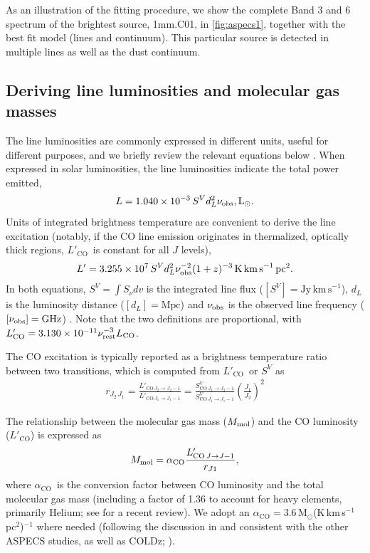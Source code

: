 \documentclass[twocolumn]{aastex62}
\newcommand{\solarmass}{\ensuremath{\mathrm{M}_{\odot}}}
\newcommand{\solarlum}{\ensuremath{\mathrm{L}_{\odot}}}
\newcommand{\Msun}{\solarmass}
\newcommand{\Lsun}{\solarlum}
\newcommand{\LCO}{\ensuremath{L'_{\mathrm{CO}}}}
\newcommand{\aco}{\ensuremath{\alpha_{\mathrm{CO}}}}
\begin{document}
As an illustration of the fitting procedure, we show the complete Band 3 and 6
spectrum of the brightest source, 1mm.C01, in \autoref{fig:aspecs1}, together
with the best fit model (lines and continuum).  This particular source is
detected in multiple lines as well as the dust continuum.

\subsection{Deriving line luminosities and molecular gas masses}
\label{sec:note-units-derived}
The line luminosities are commonly expressed in different units, useful for
different purposes, and we briefly review the relevant equations below
\citep[c.f.][]{Solomon2005, Obreschkow2009, Carilli2013}.  When expressed in
solar luminosities, the line luminosities indicate the total power emitted,
\begin{align}
  L  = 1.040 \times 10^{-3}\, S^{V} d_{L}^{2} \nu_{\rm obs} , \Lsun \label{Lline}.
\end{align}
Units of integrated brightness temperature are convenient to derive the line
excitation (notably, if the CO line emission originates in thermalized,
optically thick regions, \LCO\ is constant for all $J$ levels),
\begin{align}
  L' = 3.255 \times 10^{7}\, S^{V} d_{L}^{2} \nu_{\rm obs}^{-2} (1+z)^{-3} \, \mathrm{K\,km\,s}^{-1}\,\mathrm{pc}^{2} \label{Llineprime}.
\end{align}
In both equations, $S^{V} = \int S_{\nu} dv$ is the integrated line flux
($[S^{V}] = \mathrm{Jy\,km\,s}^{-1}$), $d_{L}$ is the luminosity distance
($[d_{L}] = \mathrm{Mpc}$) and $\nu_{\rm obs}$ is the observed line frequency
($[\nu_{\rm obs}] = \mathrm{GHz}$) \citep{Solomon1992}.  Note that the two
definitions are proportional, with
$\LCO = 3.130 \times 10^{-11} \nu_{\rm rest}^{-3} L_{\rm CO}$.

The CO excitation is typically reported as a brightness temperature ratio
between two transitions, which is computed from \LCO\ or $S^{V}$ as
\begin{align}
  r_{J_{2}\,J_{1}} = \frac{L'_{\mathrm{CO}\,J_{2}\rightarrow J_{2}-1}}{L'_{\mathrm{CO}\,J_{1}\rightarrow J_{1}-1}} = \frac{S^{V}_{\mathrm{CO}\,J_{2}\rightarrow J_{2}-1}}{S^{V}_{\mathrm{CO}\,J_{1} \rightarrow J_{1}-1}} \left(\frac{J_{1}}{J_{2}}\right)^{2} \label{eq:rJ1}
\end{align}

The relationship between the molecular gas mass ($M_{\rm mol}$) and the CO
luminosity (\LCO) is expressed as
\begin{align}
  M_{\rm mol} = \aco \frac{L'_{\mathrm{CO}\,J\rightarrow J-1}}{r_{J1}}\label{eq:Mmol},
\end{align}
where \aco\ is the conversion factor between CO luminosity and the total
molecular gas mass (including a factor of 1.36 to account for heavy elements,
primarily Helium; see \citealt{Bolatto2013} for a recent review).  We adopt an
$\aco=3.6$\,\Msun(K\,km\,s$^{-1}$\,pc$^{2}$)$^{-1}$ \citep{Daddi2010} where
needed (following the discussion in \citealt{Boogaard2019} and consistent with
the other ASPECS studies, as well as COLDz; \citealt{Riechers2019}).
\end{document}
